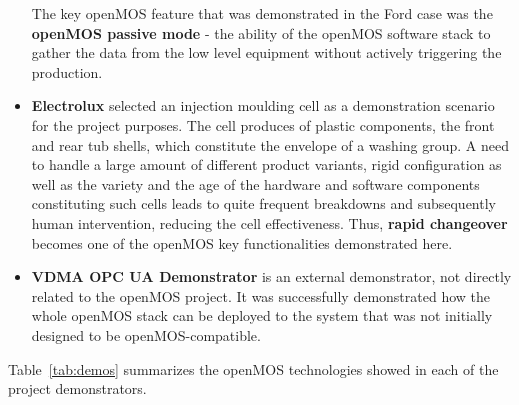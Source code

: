 \begin{itemize}
	The key \gls{openMOS} feature that was demonstrated in the Ford case was the \textbf{\gls{openMOS} passive mode} - the ability of the \gls{openMOS} software stack to gather the data from the low level equipment without actively triggering the production.
	\item \textbf{Electrolux} selected an injection moulding cell as a 
	demonstration scenario for the project purposes. 
	The cell produces of plastic components, the front and rear tub shells, which constitute the envelope of a washing group.
	A need to handle a large amount of different product variants, rigid configuration as well as the variety and the age of the hardware and software components constituting such cells leads to quite frequent breakdowns and subsequently human intervention, reducing the cell effectiveness.
	Thus, \textbf{rapid changeover} becomes one of the \gls{openMOS} key functionalities demonstrated here.
	\item \textbf{VDMA OPC UA Demonstrator} is an external demonstrator, not directly related to the \gls{openMOS} project. It was successfully demonstrated how the whole \gls{openMOS} stack can be deployed to the system that was not initially designed to be \gls{openMOS}-compatible.
\end{itemize}
Table~\ref{tab:demos} summarizes the \gls{openMOS} technologies showed in each of the project demonstrators.

